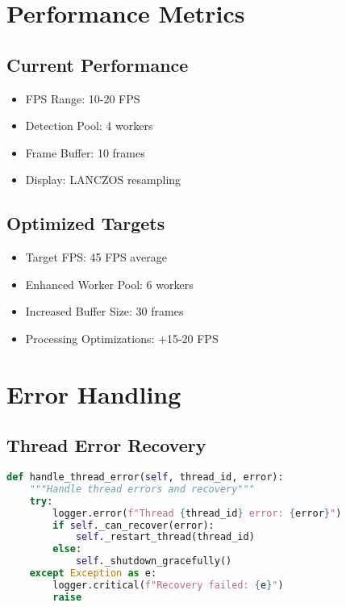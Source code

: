 \section{Performance Metrics}

\subsection{Current Performance}
\begin{itemize}
    \item FPS Range: 10-20 FPS
    \item Detection Pool: 4 workers
    \item Frame Buffer: 10 frames
    \item Display: LANCZOS resampling
\end{itemize}

\subsection{Optimized Targets}
\begin{itemize}
    \item Target FPS: 45 FPS average
    \item Enhanced Worker Pool: 6 workers
    \item Increased Buffer Size: 30 frames
    \item Processing Optimizations: +15-20 FPS
\end{itemize}

\section{Error Handling}

\subsection{Thread Error Recovery}
\begin{lstlisting}[language=Python]
def handle_thread_error(self, thread_id, error):
    """Handle thread errors and recovery"""
    try:
        logger.error(f"Thread {thread_id} error: {error}")
        if self._can_recover(error):
            self._restart_thread(thread_id)
        else:
            self._shutdown_gracefully()
    except Exception as e:
        logger.critical(f"Recovery failed: {e}")
        raise
\end{lstlisting}